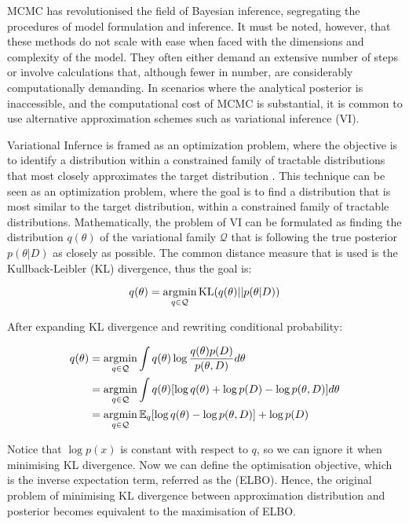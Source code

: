 MCMC has revolutionised the field of Bayesian inference, segregating the procedures of model formulation and inference. It must be noted, however, that these methods do not scale with ease when faced with the dimensions and complexity of the model. They often either demand an extensive number of steps or involve calculations that, although fewer in number, are considerably computationally demanding. In scenarios where the analytical posterior is inaccessible, and the computational cost of MCMC is substantial, it is common to use alternative approximation schemes such as variational inference (VI).

Variational Infernce is framed as an optimization problem, where the objective is to identify a distribution within a constrained family of tractable distributions that most closely approximates the target distribution \citep{Blei2017-dm}. This technique can be seen as an optimization problem, where the goal is to find a distribution that is most similar to the target distribution, within a constrained family of tractable distributions. Mathematically, the problem of VI can be formulated as finding the distribution $q(\theta)$ of the variational family $\mathcal{Q}$ that is following the true posterior $p(\theta | D)$ as closely as possible. The common distance measure that is used is the Kullback-Leibler (KL) divergence, thus the goal is:

\begin{equation}
q(\theta) = \operatorname*{\arg\!\min}_{q \in \mathcal{Q}} \text{KL}(q(\theta) || p(\theta | D))  
\end{equation}

After expanding KL divergence and rewriting conditional probability:

\begin{align}
q(\theta) &= \operatorname*{\arg\!\min}_{q \in \mathcal{Q}} \int q(\theta) \log \frac{q(\theta) p(D)}{p(\theta, D)} d\theta \\
&= \operatorname*{\arg\!\min}_{q \in \mathcal{Q}} \int q(\theta) [\log q(\theta) + \log p(D) - \log p(\theta, D)] d\theta \\
&= \operatorname*{\arg\!\min}_{q \in \mathcal{Q}} \mathbb{E}_q [\log q(\theta) -  \log p(\theta, D)] + \log p(D)
\end{align}

Notice that $\log p(x)$ is constant with respect to $q$, so we can ignore it when minimising KL divergence. Now we can define the optimisation objective, which is the inverse expectation term, referred as the  (ELBO). Hence, the original problem of minimising KL divergence between approximation distribution and posterior becomes equivalent to the maximisation of ELBO. 


